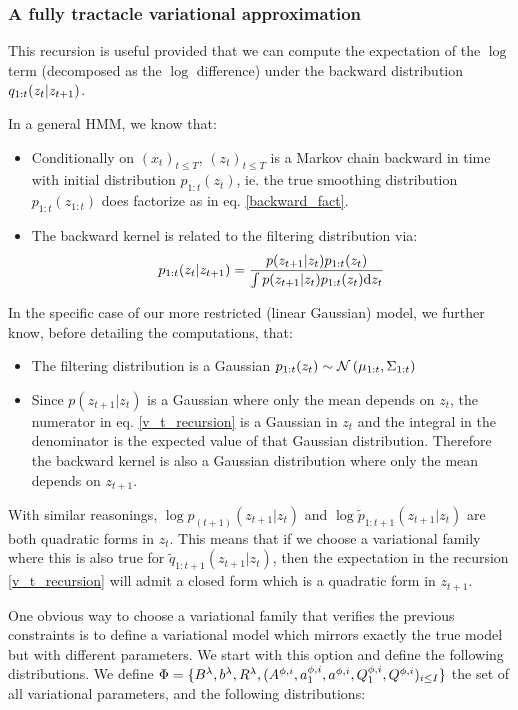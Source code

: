 \documentclass{article}
\begin{document}
\subsubsection*{A fully tractacle variational approximation}
This recursion is useful provided that we can compute the expectation of the $\log$ term (decomposed as the $\log$ difference) under the backward distribution $q_{1:t}(z_{t}|z_{t + 1})$. 

In a general HMM, we know that:

\begin{itemize}
    \item Conditionally on $(x_t)_{t \leq T}$, $(z_t)_{t \leq T}$ is a Markov chain backward in time with initial distribution $p_{1:t}(z_t)$, ie. the true smoothing distribution $p_{1:t}(z_{1:t})$ does factorize as in eq. \ref{backward_fact}.
    \item The backward kernel is related to the filtering distribution via: $$p_{1:t}(z_t|z_{t+1}) = \frac{p(z_{t+1}|z_t)p_{1:t}(z_t)}{\int p(z_{t+1}|z_t)p_{1:t}(z_t)\mathrm{d} z_t}$$
\end{itemize} 

In the specific case of our more restricted (linear Gaussian) model, we further know, before detailing the computations, that:

\begin{itemize}
    \item The filtering distribution is a Gaussian $p_{1:t}(z_t) \sim \mathcal{N}\left( \mu_{1:t}, \Sigma_{1:t} \right)$
    \item Since $p(z_{t+1}|z_t)$ is a Gaussian where only the mean depends on $z_t$, the numerator in eq. \ref{v_t_recursion} is a Gaussian in $z_t$ and the integral in the denominator is the expected value of that Gaussian distribution. Therefore the backward kernel is also a Gaussian distribution where only the mean depends on $z_{t+1}$. 
\end{itemize} 

With similar reasonings, $\log p_{(t+1)}(z_{t+1}|z_t)$ and $\log \tilde{p}_{1:t+1}(z_{t+1}|z_t)$ are both quadratic forms in $z_t$. This means that if we choose a variational family where this is also true for $\tilde{q}_{1:t+1}(z_{t+1}|z_t)$, then the expectation in the recursion \ref{v_t_recursion} will admit a closed form which is a quadratic form in $z_{t+1}$.
                                                    
One obvious way to choose a variational family that verifies the previous constraints is to define a variational model which mirrors exactly the true model but with different parameters. We start with this option and define the following distributions. We define $\Phi = \{B^\lambda, b^\lambda, R^\lambda, (A^{\phi,i}, a_1^{\phi,i}, a^{\phi,i}, Q_1^{\phi,i}, Q^{\phi,i})_{i \leq I}\}$ the set of all variational parameters, and the following distributions:
\end{document}
